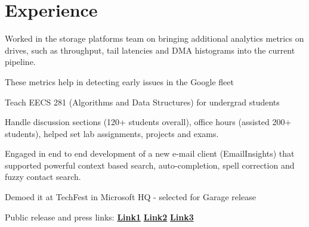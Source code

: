\documentclass[]{resume-openfont}
\begin{document}
\hfill
\begin{minipage}[t]{0.74\textwidth} 


\section{Experience}

\vspace{\topsep} %
\begin{tightemize}
\item Worked in the storage platforms team on bringing additional analytics metrics on drives, such as throughput, tail latencies and DMA histograms into the current pipeline.
\item These metrics help in detecting early issues in the Google fleet
\end{tightemize}
\sectionsep

\begin{tightemize}
\item Teach EECS 281 (Algorithms and Data Structures) for undergrad students
\item Handle discussion sections (120+ students overall), office hours (assisted 200+ students), helped set lab assignments, projects and exams.
\end{tightemize}
\sectionsep

\begin{tightemize}
\item Engaged in end to end development of a new e-mail client (EmailInsights) that supported powerful context based search, auto-completion, spell correction and fuzzy contact search. 
\item Demoed it at TechFest in Microsoft HQ - selected for Garage release
\item Public release and press links: 
\textbf{\href{http://www.zdnet.com/product/email-insights/}{Link1}}
\textbf{\href{https://www.microsoft.com/en-us/garage/profiles/email-insights/}{Link2}}
\textbf{\href{https://www.neowin.net/news/microsoft-garage-has-created-a-lightweight-email-solution-email-insights}{Link3}}


\end{tightemize}
\end{minipage}
\end{document}
